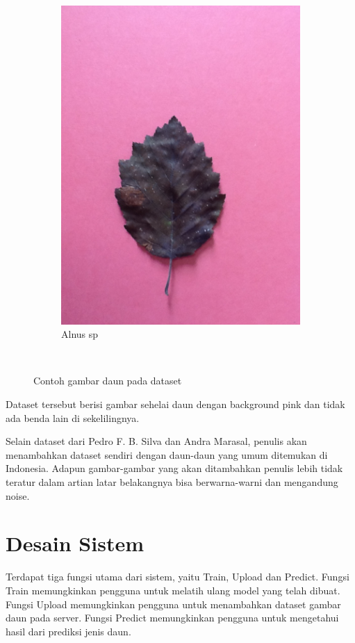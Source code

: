\begin{figure}[ht]
\begin{subfigure}{0.5\textwidth}
		\centering\includegraphics[width=\linewidth]{bab3/figures/alnus_sp.JPG}
		\caption{Alnus sp}
		\label{fig:alnus_sp}
	\end{subfigure}
	~
	\caption{Contoh gambar daun pada dataset}
\end{figure}

\par Dataset tersebut berisi gambar sehelai daun dengan background pink dan tidak ada benda lain di sekelilingnya. 

\par Selain dataset dari Pedro F. B. Silva dan Andra Marasal, penulis akan menambahkan dataset sendiri dengan daun-daun yang umum ditemukan di Indonesia. Adapun gambar-gambar yang akan ditambahkan penulis lebih tidak teratur dalam artian latar belakangnya bisa berwarna-warni dan mengandung noise.

\section{Desain Sistem}
\par Terdapat tiga fungsi utama dari sistem, yaitu Train, Upload dan Predict. Fungsi Train memungkinkan pengguna untuk melatih ulang model yang telah dibuat. Fungsi Upload memungkinkan pengguna untuk menambahkan dataset gambar daun pada server. Fungsi Predict memungkinkan pengguna untuk mengetahui hasil dari prediksi jenis daun.

